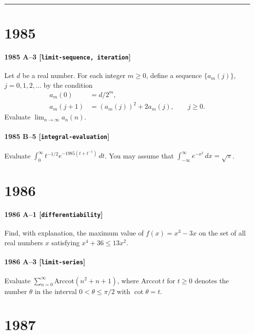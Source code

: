 \documentclass[11pt]{article}
\begin{document}
\bigskip
\hrule
\bigskip

\section*{1985}

\paragraph{1985 A--3 \textnormal{[\texttt{limit-sequence, iteration}]}}
Let $d$ be a real number. For each integer $m \geq 0$, define a
sequence $\{a_m(j)\}$, $j=0,1,2,\dots$ by the condition
\begin{align*}
a_m(0) &= d/2^m, \\
a_m(j+1) &= (a_m(j))^2 + 2a_m(j), \qquad j \geq 0.
\end{align*}
Evaluate $\lim_{n \to \infty} a_n(n)$.

\paragraph{1985 B--5 \textnormal{[\texttt{integral-evaluation}]}}
Evaluate $\int_0^\infty t^{-1/2}e^{-1985(t+t^{-1})}\,dt$. You may
assume that $\int_{-\infty}^\infty e^{-x^2}\,dx = \sqrt{\pi}$.

\section*{1986}

\paragraph{1986 A--1 \textnormal{[\texttt{differentiability}]}}
Find, with explanation, the maximum value of $f(x)=x^3-3x$ on the
set of all real numbers $x$ satisfying $x^4+36\leq 13x^2$.

\paragraph{1986 A--3 \textnormal{[\texttt{limit-series}]}}
Evaluate $\sum_{n=0}^\infty \mathrm{Arccot}(n^2+n+1)$, where
$\mathrm{Arccot}\,t$ for $t \geq 0$ denotes the number $\theta$ in the
interval $0 < \theta \leq \pi/2$ with $\cot \theta = t$.

\section*{1987}
\end{document}
